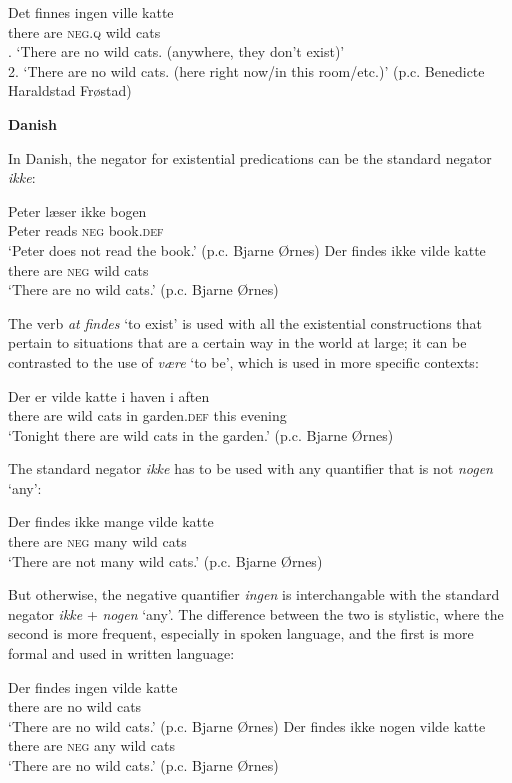﻿\documentclass[output=paper]{langsci/langscibook}
\begin{document}
\begin{unindented}
\begin{exe}\ex\gll  Det   finnes ingen ville katte\\
there are \textsc{neg.q}  wild cats\\
. `There are no wild cats. (anywhere, they don't exist)’\\
2. `There are no wild cats. (here right now/in this room/etc.)' (p.c. Benedicte Haraldstad Frøstad)
\end{exe}

\textbf{Danish}

In Danish, the negator for existential predications can be the standard negator \textit{ikke}:
%
\begin{exe}\ex \gll Peter læser ikke bogen \\
Peter reads  \textsc{neg} book.\textsc{def} \\
    \glt `Peter does not read the book.' (p.c. Bjarne Ørnes)
\ex \gll Der findes ikke vilde katte \\
there are \textsc{neg} wild cats \\
    \glt `There are no wild cats.' (p.c. Bjarne Ørnes)
    \end{exe}

The verb \textit{at} \textit{findes} `to exist' is used with all the existential constructions that pertain to situations that are a certain way in the world at large; it can be contrasted to the use of \textit{være} `to be', which is used in more specific contexts:
%
\begin{exe}\ex \gll Der er vilde katte i haven i aften \\
there are wild cats in garden.\textsc{def} this evening \\
    \glt `Tonight there are wild cats in the garden.' (p.c. Bjarne Ørnes)
    \end{exe}

The standard negator \textit{ikke} has to be used with any quantifier that is not \textit{nogen} `any':
%
\begin{exe}\ex \gll Der findes ikke mange vilde katte \\
there are \textsc{neg}  many   wild cats \\
    \glt `There are not many wild cats.' (p.c. Bjarne Ørnes)
    \end{exe}

But otherwise, the negative quantifier \textit{ingen} is interchangable with the standard negator \textit{ikke} + \textit{nogen} `any'. The difference between the two is stylistic, where the second is more frequent, especially in spoken language, and the first is more formal and used in written language:
%
\begin{exe}\ex \gll Der   findes ingen vilde katte \\
there are no     wild cats \\
    \glt `There are no wild cats.' (p.c. Bjarne Ørnes)
\ex \gll Der   findes ikke nogen vilde katte \\
there are \textsc{neg}  any  wild cats \\
    \glt `There are no wild cats.' (p.c. Bjarne Ørnes)
    \end{exe}


\end{unindented}
\end{document}
